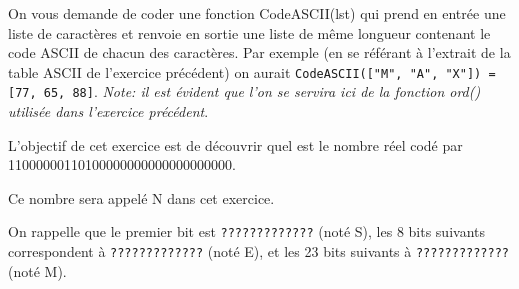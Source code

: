 \documentclass[11pt,a4paper]{exam}
\begin{document}
\begin{questions}
\begin{spacing}{1}
			\begin{solution}
			\end{solution} 
			
		
			On vous demande de coder une fonction CodeASCII(lst) qui prend en entrée une liste de caractères et renvoie en sortie une liste de même longueur contenant le code ASCII de chacun des caractères. Par exemple (en se référant à l'extrait de la table ASCII de l'exercice précédent) on aurait \texttt{CodeASCII(["M", "A", "X"]) = [77, 65, 88]}. \textit{Note: il est évident que l'on se servira ici de la fonction ord() utilisée dans l'exercice précédent}\footnotemark[2].
			
		
			
			L'objectif de cet exercice est de découvrir quel est le nombre réel codé par 11000000110100000000000000000000.
		
			Ce nombre sera appelé N dans cet exercice.
		
			On rappelle que le premier bit est  \texttt{?????????????} (noté S), les 8 bits suivants correspondent à \texttt{?????????????} (noté E), et les 23 bits suivants à \texttt{?????????????} (noté M).
		

\end{spacing}
\end{questions}
\end{document}
